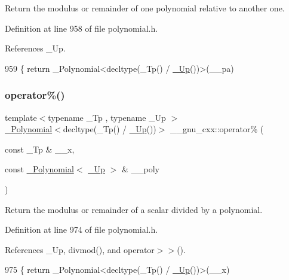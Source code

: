 Return the modulus or remainder of one polynomial relative to another one. 

Definition at line 958 of file polynomial.\+h.



References \+\_\+\+Up.


\begin{DoxyCode}
959     \{ \textcolor{keywordflow}{return} \_Polynomial<decltype(\_Tp() / \hyperlink{namespace____gnu__cxx_ab693ea357b6429b331e0bf09f9442385}{\_Up}())>(\_\_pa) %
\end{DoxyCode}
\mbox{\label{namespace____gnu__cxx_a2d1e6cb96943b2c99f71cf77a7247e77}} 
\subsubsection{\texorpdfstring{operator\%()}{operator\%()}\hspace{0.1cm}{\footnotesize\ttfamily [4/4]}}
{\footnotesize\ttfamily template$<$typename \+\_\+\+Tp , typename \+\_\+\+Up $>$ \\
\hyperlink{class____gnu__cxx_1_1__Polynomial}{\+\_\+\+Polynomial}$<$decltype(\+\_\+\+Tp() / \hyperlink{namespace____gnu__cxx_ab693ea357b6429b331e0bf09f9442385}{\+\_\+\+Up}())$>$ \+\_\+\+\_\+gnu\+\_\+cxx\+::operator\% (\begin{DoxyParamCaption}\item[{const \+\_\+\+Tp \&}]{\+\_\+\+\_\+x,  }\item[{const \hyperlink{class____gnu__cxx_1_1__Polynomial}{\+\_\+\+Polynomial}$<$ \hyperlink{namespace____gnu__cxx_ab693ea357b6429b331e0bf09f9442385}{\+\_\+\+Up} $>$ \&}]{\+\_\+\+\_\+poly }\end{DoxyParamCaption})\hspace{0.3cm}{\ttfamily [inline]}}

Return the modulus or remainder of a scalar divided by a polynomial. 

Definition at line 974 of file polynomial.\+h.



References \+\_\+\+Up, divmod(), and operator$>$$>$().


\begin{DoxyCode}
975     \{ \textcolor{keywordflow}{return} \_Polynomial<decltype(\_Tp() / \hyperlink{namespace____gnu__cxx_ab693ea357b6429b331e0bf09f9442385}{\_Up}())>(\_\_x) %
\end{DoxyCode}
\mbox{\label{namespace____gnu__cxx_a71781c23f8dd75f9cf9d7610a26225ad}} 
